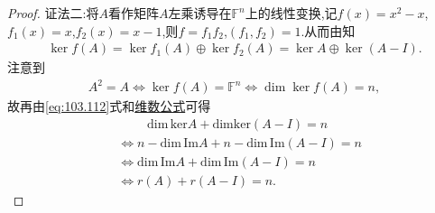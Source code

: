 \documentclass[../../main.tex]{subfiles}%
\begin{document}
\begin{proof}
{\color{blue}证法二:}将$A$看作矩阵$A$左乘诱导在$\mathbb{F}^n$上的线性变换,记$f(x)=x^2-x$,$f_1(x)=x$,$f_2(x)=x-1$,则$f=f_1f_2$,$(f_1,f_2)=1$.从而由知
\begin{align}
\ker f(A) = \ker f_1(A) \oplus \ker f_2(A) = \ker A \oplus \ker (A - I). \label{eq:103.112}
\end{align}
注意到
\begin{align*}
A^2 = A \Longleftrightarrow \ker f(A) = \mathbb{F}^n \Longleftrightarrow \dim \ker f(A) = n,
\end{align*}
故再由\eqref{eq:103.112}式和\hyperref[theorem:值域和核空间维数之和等于原像空间维数]{维数公式}可得
\begin{align*}
&\qquad \,\, \mathrm{dim}\,\mathrm{ker}A+\mathrm{dimker}\left( A-I \right) =n
\\
&\Longleftrightarrow n-\mathrm{dim}\,\mathrm{Im}A+n-\mathrm{dim}\,\mathrm{Im}\left( A-I \right) =n
\\
&\Longleftrightarrow \mathrm{dim}\,\mathrm{Im}A+\mathrm{dim}\,\mathrm{Im}\left( A-I \right) =n
\\
&\Longleftrightarrow r\left( A \right) +r\left( A-I \right) =n.
\end{align*}

\end{proof}
\end{document}
